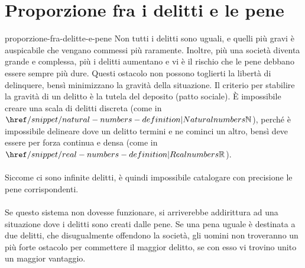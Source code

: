 \documentclass[preview]{standalone}
\begin{document}
\genpage

\section{Proporzione fra i delitti e le pene}

\begin{snippet}{proporzione-fra-delitte-e-pene}
    Non tutti i delitti sono uguali, e quelli più gravi è auspicabile che vengano
    commessi più raramente.
    Inoltre, più una società diventa grande e complessa, più i delitti aumentano
    e vi è il rischio che le pene debbano essere sempre più dure.
    Questi ostacolo non possono toglierti la libertà di delinquere, bensì minimizzano la
    gravità della situazione.
    Il criterio per stabilire la gravità di un delitto è la tutela del deposito (patto sociale).
    È impossibile creare una scala di delitti discreta (come in \(\naturalnumbers\)),
    perché è impossibile delineare dove un delitto termini e ne cominci un altro,
    bensì deve essere per forza continua e densa (come in \(\realnumbers\)).
    \\\\
    Siccome ci sono infinite delitti, è quindi impossibile catalogare
    con precisione le pene corrispondenti.
    \\\\
    Se questo sistema non dovesse funzionare, si arriverebbe addirittura ad una situazione
    dove i delitti sono creati dalle pene.
    Se una pena uguale è destinata a due delitti, che disugualmente offendono la società, gli
    uomini non troveranno un più forte ostacolo per commettere il
    maggior delitto, se con esso vi trovino unito un maggior vantaggio.
\end{snippet}
\end{document}
